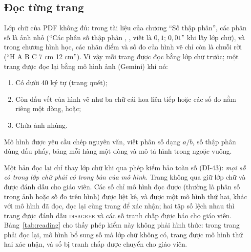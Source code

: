 \subsection{Đọc từng trang}\label{sec:reading}
Lớp chữ của PDF không đủ: trong tài liệu của chương ``Số thập phân'', các phân số là ảnh nhỏ (``Các phân số thập phân , , viết là $0{,}1$; $0{,}01$'' khi lấy lớp chữ), và trong chương hình học, các nhãn điểm và số đo của hình vẽ chỉ còn là chuỗi rời (``H A B C 7 cm 12 cm''). Vì vậy mỗi trang được đọc bằng lớp chữ trước; một trang được đọc lại bằng mô hình ảnh (Gemini) khi nó:
\begin{enumerate}[label=(\alph*)]
  \item Có dưới 40 ký tự (trang quét);
  \item Còn dấu vết của hình vẽ như ba chữ cái hoa liên tiếp hoặc các số đo nằm riêng một dòng, hoặc;
  \item Chứa ảnh nhúng.
\end{enumerate}
Mô hình được yêu cầu chép nguyên văn, viết phân số dạng $a/b$, số thập phân dùng dấu phẩy, bảng mỗi hàng một dòng và mô tả hình trong ngoặc vuông.

Một bản đọc lại chỉ thay lớp chữ khi qua phép kiểm bảo toàn số (DI-43): \emph{mọi số có trong lớp chữ phải có trong bản của mô hình}. Trang không qua giữ lớp chữ và được đánh dấu cho giáo viên. Các số chỉ mô hình đọc được (thường là phân số trong ảnh hoặc số đo trên hình) được liệt kê, và được một mô hình thứ hai, khác với mô hình đã đọc, đọc lại cùng trang để xác nhận; hai tập số lệch nhau thì trang được đánh dấu \textsc{disagree} và các số tranh chấp được báo cho giáo viên. Bảng~\ref{tab:reading} cho thấy phép kiểm này không phải hình thức: \NPagesOcr{} trong \NPages{} trang phải đọc lại, mô hình bổ sung \NNumbersAdded{} số mà lớp chữ không có, \NConfirmedPages{} trang được mô hình thứ hai xác nhận, và \NDisputedNumbers{} số bị tranh chấp được chuyển cho giáo viên.

\begin{table}[tbp]
\centering
\caption{Kết quả đọc \NPages{} trang tài liệu. ``Số chỉ OCR đọc được'' là các số mô hình ảnh đọc được mà lớp chữ không có.}
\label{tab:reading}

\end{table}

